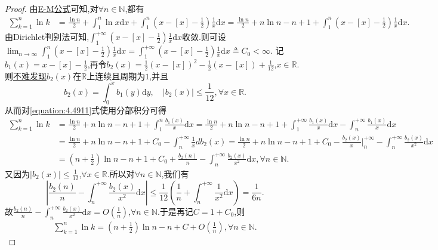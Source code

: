 \documentclass[../../main.tex]{subfiles}%
\begin{document}
\begin{proof}

由\hyperref[theorem:0阶Euler-Maclaurin公式(0阶E-M公式)]{E-M公式}可知,对\(\forall n\in\mathbb{N}\),都有
\begin{align}\label{equation:4.4911}
\sum_{k = 1}^n\ln k&=\frac{\ln n}{2}+\int_1^n\ln x\mathrm{d}x+\int_1^n\left(x - [x] - \frac{1}{2}\right)\frac{1}{x}\mathrm{d}x
=\frac{\ln n}{2}+n\ln n - n + 1+\int_1^n\left(x - [x] - \frac{1}{2}\right)\frac{1}{x}\mathrm{d}x.
\end{align}
由Dirichlet判别法可知,\(\int_1^{+\infty}\left(x - [x] - \frac{1}{2}\right)\frac{1}{x}\mathrm{d}x\)收敛.则可设\(\lim_{n\rightarrow\infty}\int_1^n\left(x - [x] - \frac{1}{2}\right)\frac{1}{x}\mathrm{d}x=\int_1^{+\infty}\left(x - [x] - \frac{1}{2}\right)\frac{1}{x}\mathrm{d}x\triangleq C_0<\infty\).
记\(b_1(x)=x - [x] - \frac{1}{2}\),再令\(b_2(x)=\frac{1}{2}(x - [x])^2 - \frac{1}{2}(x - [x]) + \frac{1}{12}\),\(x\in\mathbb{R}\).则\hyperlink{b2性质}{不难发现}\(b_2(x)\)在\(\mathbb{R}\)上连续且周期为\(1\),并且
\[
b_2(x)=\int_0^x{b_1(y)\mathrm{d}y}, \quad |b_2(x)|\leqslant\frac{1}{12}, \forall x\in\mathbb{R}.
\]
从而对\eqref{equation:4.4911}式使用分部积分可得
\begin{align*}
\sum_{k=1}^n{\ln k}&=\frac{\ln n}{2}+n\ln n-n+1+\int_1^n{\frac{b_1\left( x \right)}{x}\mathrm{d}x}=\frac{\ln n}{2}+n\ln n-n+1+\int_1^{+\infty}{\frac{b_1\left( x \right)}{x}\mathrm{d}x}-\int_n^{+\infty}{\frac{b_1\left( x \right)}{x}\mathrm{d}x}
\\
&=\frac{\ln n}{2}+n\ln n-n+1+C_0-\int_n^{+\infty}{\frac{1}{x}db_2\left( x \right)}=\frac{\ln n}{2}+n\ln n-n+1+C_0-\frac{b_2\left( x \right)}{x}\Big|_{n}^{+\infty}-\int_n^{+\infty}{\frac{b_2\left( x \right)}{x^2}\mathrm{d}x}
\\
&=\left( n+\frac{1}{2} \right) \ln n-n+1+C_0+\frac{b_2\left( n \right)}{n}-\int_n^{+\infty}{\frac{b_2\left( x \right)}{x^2}\mathrm{d}x},\forall n\in\mathbb{N}.
\end{align*}
又因为\(|b_2(x)|\leqslant\frac{1}{12}\),\(\forall x\in\mathbb{R}\).所以对\(\forall n\in\mathbb{N}\),我们有
\[
\left|\frac{b_2(n)}{n} - \int_n^{+\infty}\frac{b_2(x)}{x^2}\mathrm{d}x\right|\leqslant\frac{1}{12}\left(\frac{1}{n}+\int_n^{+\infty}\frac{1}{x^2}\mathrm{d}x\right)=\frac{1}{6n}.
\]
故\(\frac{b_2(n)}{n} - \int_n^{+\infty}\frac{b_2(x)}{x^2}\mathrm{d}x = O\left(\frac{1}{n}\right)\),\(\forall n\in\mathbb{N}\).于是再记\(C = 1 + C_0\),则
\begin{align}\label{equation:4491}
\sum_{k = 1}^n\ln k=\left(n + \frac{1}{2}\right)\ln n - n + C + O\left(\frac{1}{n}\right),\forall n\in\mathbb{N} .

\end{align}
\end{proof}
\end{document}
